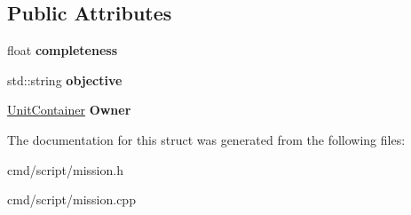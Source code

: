 \subsection*{Public Attributes}
\begin{DoxyCompactItemize}
\item 
float {\bfseries completeness}\hypertarget{structMission_1_1Objective_a6a2f63e4858b73fee7b97cabd0b6a9c1}{}\label{structMission_1_1Objective_a6a2f63e4858b73fee7b97cabd0b6a9c1}

\item 
std\+::string {\bfseries objective}\hypertarget{structMission_1_1Objective_a1fc70301f8f4a264d2158ae78b60fd2c}{}\label{structMission_1_1Objective_a1fc70301f8f4a264d2158ae78b60fd2c}

\item 
\hyperlink{classUnitContainer}{Unit\+Container} {\bfseries Owner}\hypertarget{structMission_1_1Objective_a3cbfb5c5af20d5d851f9d44e5a0c8c18}{}\label{structMission_1_1Objective_a3cbfb5c5af20d5d851f9d44e5a0c8c18}

\end{DoxyCompactItemize}


The documentation for this struct was generated from the following files\+:\begin{DoxyCompactItemize}
\item 
cmd/script/mission.\+h\item 
cmd/script/mission.\+cpp\end{DoxyCompactItemize}
